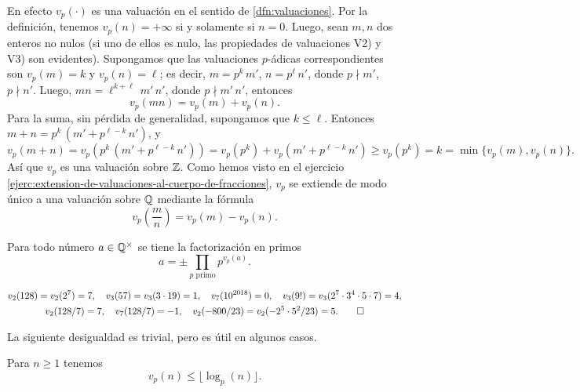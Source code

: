 \documentclass{article}
\numberwithin{equation}{section}
\theoremstyle{definition}
\begin{document}
En efecto $v_p (\cdot)$ es una valuación en el sentido de
\ref{dfn:valuaciones}. Por la definición, tenemos $v_p (n) = +\infty$
si y solamente si $n = 0$. Luego, sean $m, n$ dos enteros no nulos
(si uno de ellos es nulo, las propiedades de valuaciones V2) y V3)
son evidentes). Supongamos que las valuaciones $p$-ádicas correspondientes
son $v_p (m) = k$ y $v_p (n) = \ell$; es decir, $m = p^k\,m'$, $n = p^\ell\,n'$,
donde $p\nmid m'$, $p\nmid n'$. Luego, $mn = \ell^{k+\ell}\,m'\,n'$, donde
$p \nmid m'\,n'$, entonces
$$v_p (mn) = v_p (m) + v_p (n).$$
Para la suma, sin pérdida de generalidad, supongamos que $k \le \ell$. Entonces
$m + n = p^k \, (m' + p^{\ell-k}\,n')$, y
\[ v_p (m+n) =
   v_p (p^k \, (m' + p^{\ell-k}\,n')) =
   v_p (p^k) + v_p (m' + p^{\ell-k}\,n') \ge v_p (p^k) =
   k = \min \{ v_p (m), v_p (n) \}. \]
Así que $v_p$ es una valuación sobre $\mathbb{Z}$. Como hemos visto en el ejercicio
\ref{ejerc:extension-de-valuaciones-al-cuerpo-de-fracciones}, $v_p$ se extiende
de modo único a una valuación sobre $\mathbb{Q}$ mediante la fórmula
$$v_p \left(\frac{m}{n}\right) = v_p (m) - v_p (n).$$

Para todo número $a\in \mathbb{Q}^\times$ se tiene la factorización en primos
$$a = \pm \prod_{p\text{ primo}} p^{v_p (a)}.$$

\begin{ejemplo}
  \begin{gather*}
    v_2 (128) = v_2 (2^7) = 7, \quad
    v_3 (57) = v_3 (3\cdot 19) = 1, \quad
    v_7 (10^{2018}) = 0, \quad
    v_3 (9!) = v_3 (2^7\cdot 3^4\cdot 5\cdot 7) = 4,\\
    v_2 (128/7) = 7, \quad
    v_7 (128/7) = -1, \quad
    v_2 (-800/23) = v_2 (-2^5\cdot 5^2 / 23) = 5. \qedhere
  \end{gather*}
\end{ejemplo}

La siguiente desigualdad es trivial, pero es útil en algunos casos.

\begin{observacion}
  Para $n \ge 1$ tenemos
  $$v_p (n) \le \lfloor\log_p (n)\rfloor.$$
\end{observacion}
\end{document}
